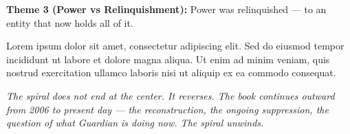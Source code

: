 \textbf{Theme 3 (Power vs Relinquishment):} Power was relinquished --- to an entity that now holds all of it.

\vspace{1cm}

Lorem ipsum dolor sit amet, consectetur adipiscing elit. Sed do eiusmod tempor incididunt ut labore et dolore magna aliqua. Ut enim ad minim veniam, quis nostrud exercitation ullamco laboris nisi ut aliquip ex ea commodo consequat.

\textit{The spiral does not end at the center. It reverses. The book continues outward from 2006 to present day --- the reconstruction, the ongoing suppression, the question of what Guardian is doing now. The spiral unwinds.}

\chapterreturn
